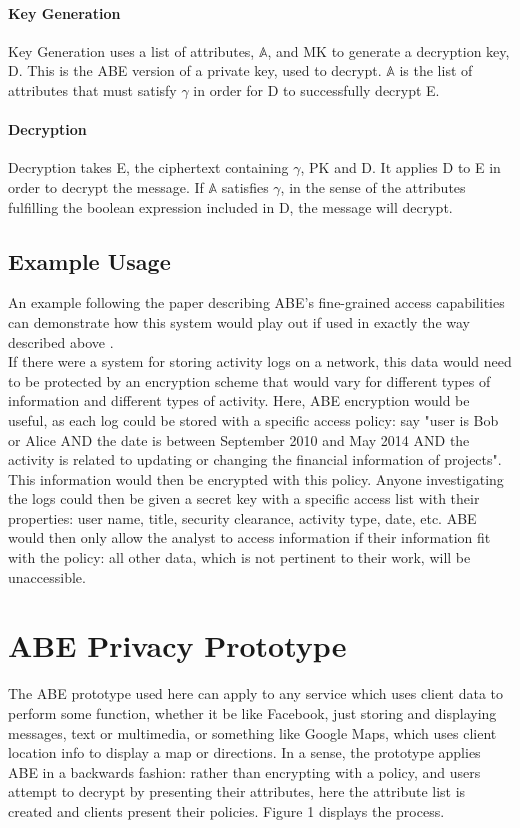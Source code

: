 \documentclass[12pt]{article}
\begin{document}
\paragraph{Key Generation}
Key Generation uses a list of attributes, $\mathbb{A}$, and MK to generate a decryption key, D. This is the ABE version of a private key, used to decrypt. $\mathbb{A}$ is the list of attributes that must satisfy $\gamma$ in order for D to successfully decrypt E. 
\paragraph{Decryption}
Decryption takes E, the ciphertext containing $\gamma$, PK and D. It applies D to E in order to decrypt the message. If $\mathbb{A}$ satisfies $\gamma$, in the sense of the attributes fulfilling the boolean expression included in D, the message will decrypt.

\subsection{Example Usage}
An example following the paper describing ABE's fine-grained access capabilities can demonstrate how this system would play out if used in exactly the way described above \cite{abe}. \\
If there were a system for storing activity logs on a network, this data would need to be protected by an encryption scheme that would vary for different types of information and different types of activity. Here, ABE encryption would be useful, as each log could be stored with a specific access policy: say "user is Bob or Alice AND the date is between September 2010 and May 2014 AND the activity is related to updating or changing the financial information of projects". This information would then be encrypted with this policy. Anyone investigating the logs could then be given a secret key with a specific access list with their properties: user name, title, security clearance, activity type, date, etc.  ABE would then only allow the analyst to access information if their information fit with the policy: all other data, which is not pertinent to their work, will be unaccessible.

\section{ABE Privacy Prototype}
The ABE prototype used here can apply to any service which uses client data to perform some function, whether it be like Facebook, just storing and displaying messages, text or multimedia, or something like Google Maps, which uses client location info to display a map or directions. In a sense, the prototype applies ABE in a backwards fashion: rather than encrypting with a policy, and users attempt to decrypt by presenting their attributes, here the attribute list is created and clients present their policies. Figure 1 displays the process. \\
\end{document}
